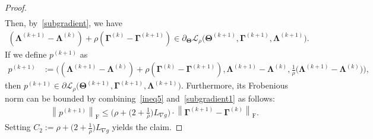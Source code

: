 \documentclass[alpha-refs]{wiley-article}
\begin{document}
\begin{proof}
\begin{align*}
\end{align*}
Then, by~\eqref{subgradient}, we have
\begin{align*}
    (\boldsymbol{\Lambda}^{(k+1)} - \boldsymbol{\Lambda}^{(k)}) + \rho (\boldsymbol{\Gamma}^{(k)} - \boldsymbol{\Gamma}^{(k+1)} )
    \in \partial_{\boldsymbol{\Theta}}\mathcal{L}_{\rho} \big( \boldsymbol{\Theta}^{(k+1)},\boldsymbol{\Gamma}^{(k+1)},\boldsymbol{\Lambda}^{(k+1)} \big).
\end{align*}
If we define $p^{(k+1)}$ as
\begin{align} \label{subgradient1}
    p^{(k+1)} 
    &:=\bigg( (\boldsymbol{\Lambda}^{(k+1)} - \boldsymbol{\Lambda}^{(k)}) + \rho (\boldsymbol{\Gamma}^{(k)} - \boldsymbol{\Gamma}^{(k+1)} ),  
    \boldsymbol{\Lambda}^{(k+1)} - \boldsymbol{\Lambda}^{(k)}, \frac{1}{\rho} \big( \boldsymbol{\Lambda}^{(k+1)} - \boldsymbol{\Lambda}^{(k)} \big) \bigg),
\end{align}
then $p^{(k+1)}\in\partial \mathcal{L}_{\rho} \big( \boldsymbol{\Theta}^{(k+1)},\boldsymbol{\Gamma}^{(k+1)},\boldsymbol{\Lambda}^{(k+1)} \big)$.
Furthermore, its Frobenious norm can be bounded by combining~\eqref{ineq5} and~\eqref{subgradient1} as follows:
\begin{align*}
    \left\| p^{(k+1)} \right\|_{\text{F}} \leq 
    \bigg( \rho + \big(2+\frac{1}{\rho}\big)L_{\nabla g} \bigg) \cdot 
    \left\| \boldsymbol{\Gamma}^{(k+1)} - \boldsymbol{\Gamma}^{(k)} \right\|_{\text{F}}.
\end{align*}
Setting $C_{2}:=\rho + \big(2+\frac{1}{\rho}\big)L_{\nabla g}$ yields the claim.
\end{proof}
\end{document}
